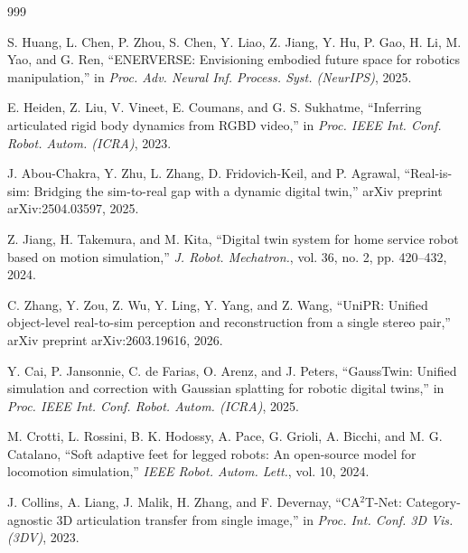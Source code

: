 \documentclass[11pt,a4paper]{article}
\begin{document}
\begin{thebibliography}{999}

S. Huang, L. Chen, P. Zhou, S. Chen, Y. Liao, Z. Jiang, Y. Hu, P. Gao, H. Li, M. Yao, and G. Ren, ``{ENERVERSE}: Envisioning embodied future space for robotics manipulation,'' in \textit{Proc. Adv. Neural Inf. Process. Syst. (NeurIPS)}, 2025.




E. Heiden, Z. Liu, V. Vineet, E. Coumans, and G. S. Sukhatme, ``Inferring articulated rigid body dynamics from RGBD video,'' in \textit{Proc. IEEE Int. Conf. Robot. Autom. (ICRA)}, 2023.




J. Abou-Chakra, Y. Zhu, L. Zhang, D. Fridovich-Keil, and P. Agrawal, ``Real-is-sim: Bridging the sim-to-real gap with a dynamic digital twin,'' arXiv preprint arXiv:2504.03597, 2025.




Z. Jiang, H. Takemura, and M. Kita, ``Digital twin system for home service robot based on motion simulation,'' \textit{J. Robot. Mechatron.}, vol. 36, no. 2, pp. 420--432, 2024.




C. Zhang, Y. Zou, Z. Wu, Y. Ling, Y. Yang, and Z. Wang, ``{UniPR}: Unified object-level real-to-sim perception and reconstruction from a single stereo pair,'' arXiv preprint arXiv:2603.19616, 2026.




Y. Cai, P. Jansonnie, C. de Farias, O. Arenz, and J. Peters, ``{GaussTwin}: Unified simulation and correction with Gaussian splatting for robotic digital twins,'' in \textit{Proc. IEEE Int. Conf. Robot. Autom. (ICRA)}, 2025.




M. Crotti, L. Rossini, B. K. Hodossy, A. Pace, G. Grioli, A. Bicchi, and M. G. Catalano, ``Soft adaptive feet for legged robots: An open-source model for locomotion simulation,'' \textit{IEEE Robot. Autom. Lett.}, vol. 10, 2024.




J. Collins, A. Liang, J. Malik, H. Zhang, and F. Devernay, ``{CA}$^2${T}-Net: Category-agnostic 3D articulation transfer from single image,'' in \textit{Proc. Int. Conf. 3D Vis. (3DV)}, 2023.




\end{thebibliography}
\end{document}
